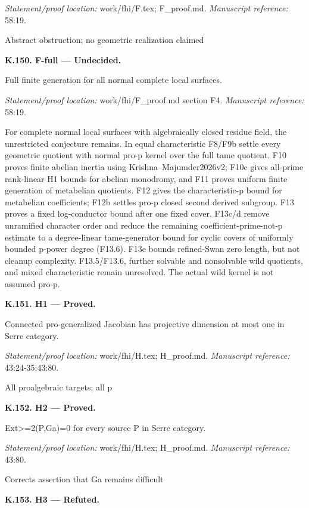 \par\emph{Statement/proof location:} work/fhi/F.tex; F\_proof.md.
\emph{Manuscript reference:} 58:19.
\par Abstract obstruction; no geometric realization claimed
\par\medskip\noindent\textbf{K.150. F-full --- Undecided.}\par
Full finite generation for all normal complete local surfaces.
\par\emph{Statement/proof location:} work/fhi/F\_proof.md section F4.
\emph{Manuscript reference:} 58:19.
\par For complete normal local surfaces with algebraically closed residue field, the unrestricted conjecture remains. In equal characteristic F8/F9b settle every geometric quotient with normal pro-p kernel over the full tame quotient. F10 proves finite abelian inertia using Krishna–Majumder2026v2; F10c gives all-prime rank-linear H1 bounds for abelian monodromy, and F11 proves uniform finite generation of metabelian quotients. F12 gives the characteristic-p bound for metabelian coefficients; F12b settles pro-p closed second derived subgroup. F13 proves a fixed log-conductor bound after one fixed cover. F13c/d remove unramified character order and reduce the remaining coefficient-prime-not-p estimate to a degree-linear tame-generator bound for cyclic covers of uniformly bounded p-power degree (F13.6). F13e bounds refined-Swan zero length, but not cleanup complexity. F13.5/F13.6, further solvable and nonsolvable wild quotients, and mixed characteristic remain unresolved. The actual wild kernel is not assumed pro-p.
\par\medskip\noindent\textbf{K.151. H1 --- Proved.}\par
Connected pro-generalized Jacobian has projective dimension at most one in Serre category.
\par\emph{Statement/proof location:} work/fhi/H.tex; H\_proof.md.
\emph{Manuscript reference:} 43:24-35;43:80.
\par All proalgebraic targets; all p
\par\medskip\noindent\textbf{K.152. H2 --- Proved.}\par
Ext>=2(P,Ga)=0 for every source P in Serre category.
\par\emph{Statement/proof location:} work/fhi/H.tex; H\_proof.md.
\emph{Manuscript reference:} 43:80.
\par Corrects assertion that Ga remains difficult
\par\medskip\noindent\textbf{K.153. H3 --- Refuted.}\par
